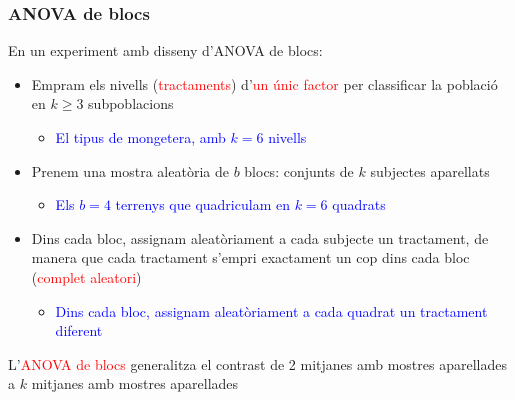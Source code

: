 \documentclass[12pt,t]{beamer}
\newcommand{\red}[1]{\textcolor{red}{#1}}
\newcommand{\blue}[1]{\textcolor{blue}{#1}}
\renewcommand{\emph}[1]{{\color{red}#1}}
\renewcommand{\geq}{\geqslant}
\theoremstyle{plain}
\theoremstyle{definition}
\begin{document}
\begin{frame}
\frametitle{ANOVA de blocs}

En un experiment amb \emph{disseny d'ANOVA de blocs}:

\begin{itemize}
\item Empram els nivells (\red{tractaments}) d'\red{un únic factor} per classificar la població en $k\geq 3$ subpoblacions
\begin{itemize}
\item \blue{El tipus de mongetera, amb $k=6$ nivells}
\end{itemize}


\item Prenem una mostra aleatòria de $b$ \emph{blocs}: conjunts de $k$ subjectes aparellats
\begin{itemize}
\item \blue{Els $b=4$ terrenys que quadriculam  en $k=6$ quadrats}
\end{itemize}


\item Dins cada bloc, assignam aleatòriament a cada subjecte un tractament, de manera que cada tractament s'empri exactament un cop dins  cada bloc (\red{complet aleatori})
\begin{itemize}
\item \blue{Dins cada bloc, assignam aleatòriament a cada quadrat un tractament diferent}
\end{itemize}
\end{itemize}

L'\red{ANOVA de blocs} generalitza el contrast de 2 mitjanes  amb mostres aparellades a $k$ mitjanes  amb mostres aparellades
\end{frame}
\end{document}
